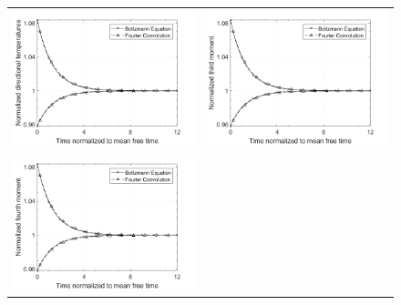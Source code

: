 \documentclass[12pt]{CSUNthesis}
\begin{document}
\begin{center}
\begin{figure}[h]
\centering
  \begin{tabular}{@{}cc@{}}
  \includegraphics[height=.25\textheight]{images/reles_m155_5s15n_mom2.png}&
  \includegraphics[height=.25\textheight]{images/reles_m155_5s15n_mom3.png}\\      
  \includegraphics[height=.25\textheight]{images/reles_m155_5s15n_mom4.png}&

\end{tabular}
\end{figure}
\end{center}
\end{document}
